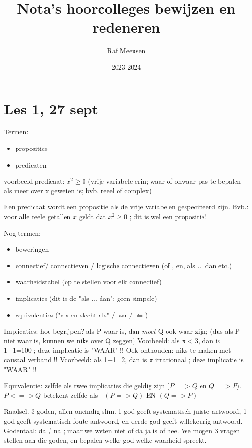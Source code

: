 \documentclass{article}
\title{Nota's hoorcolleges bewijzen en redeneren}
\author{Raf Meeusen}
\date{2023-2024}
\begin{document}
\maketitle

\section{Les 1, 27 sept}

Termen: \begin{itemize}
    \item proposities
    \item predicaten
\end{itemize}


voorbeeld predicaat: $x^2 \geq 0 $
(vrije variabele erin; waar of onwaar pas te bepalen als meer over x geweten is; bvb. reeel of complex) 

Een predicaat wordt een propositie als de vrije variabelen gespecifieerd zijn. 
Bvb.: voor alle reele getallen $x$ geldt dat $x^2 \geq 0$  ; dit is wel een propositie! 

Nog termen: 
\begin{itemize}
    \item beweringen
    \item connectief/ connectieven / logische connectieven (of , en, als ... dan etc.) 
    \item waarheidstabel (op te stellen voor elk connectief) 
\item implicaties (dit is de "als ... dan"; geen simpele) 
\item equivalenties ("als en slecht als" / asa / $\Leftrightarrow$) 

\end{itemize}


Implicaties: 
hoe begrijpen? als P waar is, dan \emph{moet} Q ook waar zijn; (dus als P niet waar is, kunnen we niks over Q zeggen) 
Voorbeeld: als $\pi < 3$, dan is 1+1=100 ; deze implicatie is "WAAR" !! 
Ook onthouden: niks te maken met causaal verband !! 
Voorbeeld: als 1+1=2, dan is $\pi$ irrationaal ; deze implicatie is "WAAR" !! 

Equivalentie: zelfde als twee implicaties die geldig zijn ($P=>Q$ en $Q=>P$). 
$P <=> Q $ betekent zelfde als : $(P=>Q)$  EN  $(Q=>P) $

Raadsel. 3 goden, allen oneindig slim. 1 god geeft systematisch juiste antwoord, 1 god geeft systematisch foute antwoord, en derde god geeft willekeurig antwoord. 
Godentaal: da / na ; maar we weten niet of da ja is of nee. 
We mogen 3 vragen stellen aan die goden, en bepalen welke god welke waarheid spreekt. 
\end{document}
